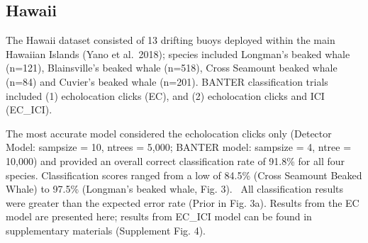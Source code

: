 \documentclass[
  letterpaper,
  DIV=11,
  numbers=noendperiod]{scrartcl}
\begin{document}
\hypertarget{hawaii}{%
\subsection{Hawaii}\label{hawaii}}

The Hawaii dataset consisted of 13 drifting buoys deployed within the
main Hawaiian Islands (Yano et al.~2018); species included Longman's
beaked whale (n=121), Blainsville's beaked whale (n=518), Cross Seamount
beaked whale (n=84) and Cuvier's beaked whale (n=201). BANTER
classification trials included (1) echolocation clicks (EC), and (2)
echolocation clicks and ICI (EC\_ICI).

The most accurate model considered the echolocation clicks only
(Detector Model: sampsize = 10, ntrees = 5,000; BANTER model: sampsize =
4, ntree = 10,000) and provided an overall correct classification rate
of 91.8\% for all four species. Classification scores ranged from a low
of 84.5\% (Cross Seamount Beaked Whale) to 97.5\% (Longman's beaked
whale, Fig. 3). ~All classification results were greater than the
expected error rate (Prior in Fig. 3a). Results from the EC model are
presented here; results from EC\_ICI model can be found in supplementary
materials (Supplement Fig. 4).
\end{document}
